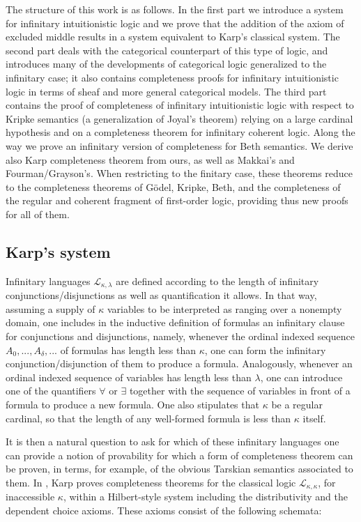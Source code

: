 \documentclass[a4paper,11pt]{article}
\theoremstyle{plain}
\theoremstyle{plain}
\theoremstyle{remark}
\begin{document}
The structure of this work is as follows. In the first part we introduce a system for infinitary intuitionistic logic and we prove that the addition of the axiom of excluded middle results in a system equivalent to Karp's classical system. The second part deals with the categorical counterpart of this type of logic, and introduces many of the developments of categorical logic generalized to the infinitary case; it also contains completeness proofs for infinitary intuitionistic logic in terms of sheaf and more general categorical models. The third part contains the proof of completeness of infinitary intuitionistic logic with respect to Kripke semantics (a generalization of Joyal's theorem) relying on a large cardinal hypothesis and on a completeness theorem for infinitary coherent logic. Along the way we prove an infinitary version of completeness for Beth semantics. We derive also Karp completeness theorem from ours, as well as Makkai's and Fourman/Grayson's. When restricting to the finitary case, these theorems reduce to the completeness theorems of G\"odel, Kripke, Beth, and the completeness of the regular and coherent fragment of first-order logic, providing thus new proofs for all of them.


\subsection{Karp's system}

Infinitary languages $\mathcal{L}_{\kappa, \lambda}$ are defined according to the length of infinitary conjunctions/disjunctions as well as quantification it allows. In that way, assuming a supply of $\kappa$ variables to be interpreted as ranging over a nonempty domain, one includes in the inductive definition of formulas an infinitary clause for conjunctions and disjunctions, namely, whenever the ordinal indexed sequence $A_0, ..., A_{\delta}, ...$ of formulas has length less than $\kappa$, one can form the infinitary conjunction/disjunction of them to produce a formula. Analogously, whenever an ordinal indexed sequence of variables has length less than $\lambda$, one can introduce one of the quantifiers $\forall$ or $\exists$ together with the sequence of variables in front of a formula to produce a new formula. One also stipulates that $\kappa$ be a regular cardinal, so that the length of any well-formed formula is less than $\kappa$ itself. 

It is then a natural question to ask for which of these infinitary languages one can provide a notion of provability for which a form of completeness theorem can be proven, in terms, for example, of the obvious Tarskian semantics associated to them. In \cite{karp}, Karp proves completeness theorems for the classical logic $\mathcal{L}_{\kappa, \kappa}$, for inaccessible $\kappa$, within a Hilbert-style system including the distributivity and the dependent choice axioms. These axioms consist of the following schemata:
\end{document}
